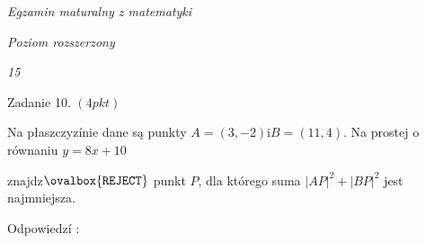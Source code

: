\documentclass[a4paper,12pt]{article}
\begin{document}
{\it Egzamin maturalny z matematyki}

{\it Poziom rozszerzony}

{\it 15}

Zadanie 10. $(4pkt)$

Na płaszczyzínie dane są punkty $A=(3,-2) \mathrm{i}B=(11,4)$. Na prostej o równaniu $y=8x+10$

znajdz$\ovalbox{\tt\small REJECT}$ punkt $P$, dla którego suma $|AP|^{2}+|BP|^{2}$ jest najmniejsza.

Odpowiedzí :
\end{document}
